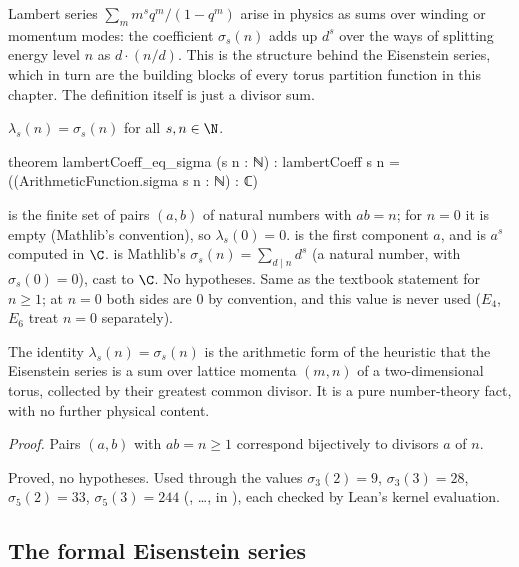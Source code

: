 \begin{physics}
Lambert series $\sum_m m^sq^m/(1-q^m)$ arise in physics as sums over winding or momentum modes: the coefficient $\sigma_s(n)$ adds up $d^s$ over the ways of splitting energy level $n$ as $d\cdot(n/d)$. This is the structure behind the Eisenstein series, which in turn are the building blocks of every torus partition function in this chapter. The definition itself is just a divisor sum.
\end{physics}

\begin{theorem}\label{ch05:thm:lambert}
$\lambda_s(n) = \sigma_s(n)$ for all $s,n\in\N$.
\end{theorem}
\begin{leancode}
theorem lambertCoeff_eq_sigma (s n : ℕ) :
    lambertCoeff s n = ((ArithmeticFunction.sigma s n : ℕ) : ℂ)
\end{leancode}
\begin{dictionary}
 is the finite set of pairs $(a,b)$ of natural numbers with $ab = n$; for
$n = 0$ it is empty (Mathlib's convention), so $\lambda_s(0) = 0$.  is the first component
$a$, and  is $a^s$ computed in $\C$.  is
Mathlib's $\sigma_s(n) = \sum_{d\mid n}d^s$ (a natural number, with $\sigma_s(0) = 0$), cast to $\C$.
No hypotheses. Same as the textbook statement for $n\ge1$; at $n = 0$ both sides are $0$ by
convention, and this value is never used ($E_4$, $E_6$ treat $n = 0$ separately).
\end{dictionary}

\begin{physics}
The identity $\lambda_s(n)=\sigma_s(n)$ is the arithmetic form of the heuristic that the Eisenstein series is a sum over lattice momenta $(m,n)$ of a two-dimensional torus, collected by their greatest common divisor. It is a pure number-theory fact, with no further physical content.
\end{physics}
\noindent\emph{Proof.} Pairs $(a,b)$ with $ab = n\ge1$ correspond bijectively to divisors $a$ of $n$.
\begin{status}
Proved, no hypotheses. Used through the values $\sigma_3(2) = 9$, $\sigma_3(3) = 28$, $\sigma_5(2) = 33$,
$\sigma_5(3) = 244$ (, \dots, in ), each checked by
Lean's kernel evaluation.
\end{status}

\subsection{The formal Eisenstein series}

